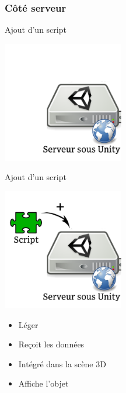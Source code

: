 \documentclass[a4paper,10pt]{beamer}
\begin{document}
	\subsubsection{Côté serveur}
	
	\begin{frame}{Ajout d'un script}
		\centerline{\includegraphics[height=150pt]{images/network/plugin1.png}}
		
	\end{frame}
	\begin{frame}{Ajout d'un script}
		\centerline{\includegraphics[height=150pt]{images/network/plugin.png}}
		\begin{itemize}	
			\item \pause Léger \pause
			\item Reçoit les données \pause
			\item Intégré dans la scène 3D \pause
			\item Affiche l'objet 
		\end{itemize}	
		
	\end{frame}
	
\end{document}
